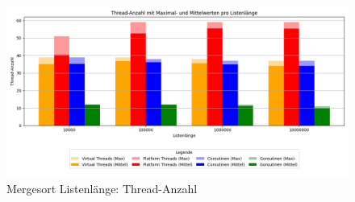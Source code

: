 \documentclass[fontsize=12pt,paper=a4,twoside=semi,parskip=half-,headsepline,headinclude]{scrreprt}
\begin{document}
\begin{figure}[H]
	\centering
	\includegraphics[scale=0.5]{figures/mergesort/Listenlaenge/num_threads_bar_plot.png}
	\caption{Mergesort Listenlänge: Thread-Anzahl}
	\label{fig:mslaengeThreads}
\end{figure}
\end{document}
